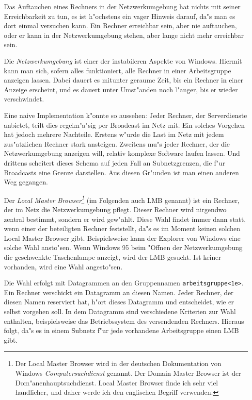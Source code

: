 \documentclass{scrartcl}\usepackage{pslatex}\typearea{12}
\newcommand{\nbname}{\texttt}
\newcommand{\defin}{\emph}
\begin{document}
Das Auftauchen eines Rechners in der Netzwerkumgebung hat nichts mit
seiner Erreichbarkeit zu tun, es ist h"ochstens ein vager Hinweis
darauf, da"s man es dort einmal versuchen kann. Ein Rechner
erreichbar sein, aber nie auftauchen, oder er kann in der
Netzwerkumgebung stehen, aber lange nicht mehr erreichbar sein.

Die \defin{Netzwerkumgebung} ist einer der instabileren Aspekte von
Windows. Hiermit kann man sich, sofern alles funktioniert, alle
Rechner in einer Arbeitsgruppe anzeigen lassen. Dabei dauert es
mitunter geraume Zeit, bis ein Rechner in einer Anzeige erscheint, und
es dauert unter Umst"anden noch l"anger, bis er wieder verschwindet.

Eine naive Implementation k"onnte so aussehen: Jeder Rechner,
der Serverdienste anbietet, teilt dies regelm"a"sig per Broadcast im Netz
mit. Ein solches Vorgehen hat jedoch mehrere Nachteile. Erstens
w"urde die Last im Netz mit jedem zus"atzlichen Rechner stark
ansteigen. Zweitens mu"s jeder Rechner, der die Netzwerkumgebung anzeigen
will, relativ komplexe Software laufen lassen. Und drittens scheitert dieses
Schema auf jeden Fall an Subnetzgrenzen, die f"ur Broadcasts eine
Grenze darstellen. Aus diesen Gr"unden ist man einen anderen Weg
gegangen.

Der \defin{Local Master Browser\footnote{Der Local Master Browser
    wird in der deutschen Dokumentation von Windows
    \emph{Computersuchdienst} genannt. Der Domain Master Browser ist
    der Dom"anenhauptsuchdienst. Local Master Browser finde ich sehr
    viel handlicher, und daher werde ich den englischen Begriff
    verwenden.}} (im Folgenden auch LMB genannt) ist ein Rechner, der
im Netz die Netzwerkumgebung pflegt. Dieser Rechner wird nirgendwo
zentral bestimmt, sondern er wird gew"ahlt. Diese Wahl findet immer
dann statt, wenn einer der beteiligten Rechner feststellt, da"s es im
Moment keinen solchen Local Master Browser gibt.  Beispielsweise
kann der Explorer von Windows eine solche Wahl ansto"sen. Wenn Windows
95 beim "Offnen der Netzwerkumgebung die geschwenkte Taschenlampe anzeigt,
wird der LMB gesucht. Ist
keiner vorhanden, wird eine Wahl angesto"sen.

Die Wahl erfolgt mit Datagrammen an den Gruppennamen
\nbname{arbeitsgruppe<1e>}. Ein Rechner verschickt ein Datagramm an
diesen Namen. Jeder Rechner, der diesen Namen reserviert hat, h"ort
dieses Datagramm und entscheidet, wie er selbst vorgehen soll.  In dem
Datagramm sind verschiedene Kriterien zur Wahl enthalten,
beispielsweise das Betriebssystem des versendenden Rechners. Hieraus folgt,
da"s es in einem Subnetz f"ur jede vorhandene Arbeitsgruppe einen LMB gibt.
\end{document}
